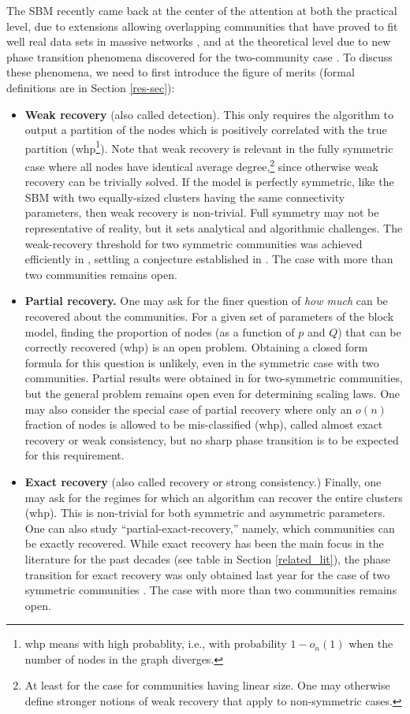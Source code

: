 \documentclass[11pt]{article}
\newcommand{\1}{\mathbb{1}}
\begin{document}
The SBM recently came back at the center of the attention at both the practical level, due to extensions allowing overlapping communities \cite{mixed-core} that have proved to fit well real data sets in massive networks \cite{prem}, and at the theoretical level due to new phase transition phenomena discovered for the two-community case \cite{coja-sbm,decelle,massoulie-STOC,Mossel_SBM2,abh,mossel-consist}. To discuss these phenomena, we need to first introduce the figure of merits (formal definitions are in Section \ref{res-sec}):
\begin{itemize}
\item  {\bf Weak recovery} (also called detection). This only requires the algorithm to output a partition of the nodes which is  positively correlated with the true partition (whp\footnote{whp means with high probablity, i.e., with probability $1-o_n(1)$ when the number of nodes in the graph diverges.}). Note that weak recovery is relevant in the fully symmetric case where all nodes have identical average degree,\footnote{At least for the case for communities having linear size. One may otherwise define stronger notions of weak recovery that apply to non-symmetric cases.} since otherwise weak recovery can be trivially solved. If the model is perfectly symmetric, like the SBM with two equally-sized clusters having the same connectivity parameters, then weak recovery is non-trivial. Full symmetry may not be representative of reality, but it sets analytical and algorithmic challenges. The weak-recovery threshold for two symmetric communities was achieved efficiently in \cite{massoulie-STOC,Mossel_SBM2}, settling a conjecture established in \cite{decelle}. The case with more than two communities remains open. 
\item {\bf Partial recovery.} One may ask for the finer question of {\it how much} can be recovered about the communities. For a given set of parameters of the block model, finding the proportion of nodes (as a function of $p$ and $Q$) that can be correctly recovered (whp) is an open problem. Obtaining a closed form formula for this question is unlikely, even in the symmetric case with two communities. Partial results were obtained in \cite{mossel2} for two-symmetric communities, but the general problem remains open even for determining scaling laws. 
One may also consider the special case of partial recovery where only an $o(n)$ fraction of nodes is allowed to be mis-classified (whp), called almost exact recovery or weak consistency, but no sharp phase transition is to be expected for this requirement.
\item {\bf Exact recovery} (also called recovery or strong consistency.) Finally, one may ask for the regimes for which an algorithm can recover the entire clusters (whp). This is non-trivial for both symmetric and asymmetric parameters. One can also study ``partial-exact-recovery,'' namely, which communities can be exactly recovered. While exact recovery has been the main focus in the literature for the past decades (see table in Section \ref{related_lit}), the phase transition for exact recovery was only obtained last year for the case of two symmetric communities \cite{abh,mossel-consist}. The case with more than two communities remains open. 
\end{itemize}
\end{document}
